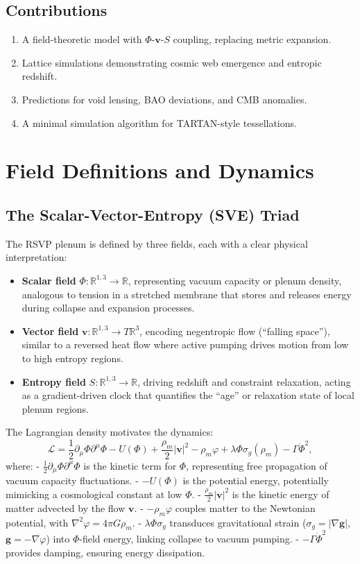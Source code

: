\documentclass[11pt]{article}
\theoremstyle{plain}
\theoremstyle{definition}
\begin{document}
\subsection{Contributions}
\begin{enumerate}
    \item A field-theoretic model with $\Phi$-$\bm{v}$-$S$ coupling, replacing metric expansion.
    \item Lattice simulations demonstrating cosmic web emergence and entropic redshift.
    \item Predictions for void lensing, BAO deviations, and CMB anomalies.
    \item A minimal simulation algorithm for TARTAN-style tessellations.
\end{enumerate}

\section{Field Definitions and Dynamics}
\subsection{The Scalar-Vector-Entropy (SVE) Triad}
The RSVP plenum is defined by three fields, each with a clear physical interpretation:
\begin{itemize}
    \item \textbf{Scalar field} $\Phi: \mathbb{R}^{1,3} \to \mathbb{R}$, representing vacuum capacity or plenum density, analogous to tension in a stretched membrane that stores and releases energy during collapse and expansion processes.
    \item \textbf{Vector field} $\bm{v}: \mathbb{R}^{1,3} \to T\mathbb{R}^3$, encoding negentropic flow (``falling space''), similar to a reversed heat flow where active pumping drives motion from low to high entropy regions.
    \item \textbf{Entropy field} $S: \mathbb{R}^{1,3} \to \mathbb{R}$, driving redshift and constraint relaxation, acting as a gradient-driven clock that quantifies the ``age'' or relaxation state of local plenum regions.
\end{itemize}

The Lagrangian density motivates the dynamics:
\begin{equation}
\mathcal{L} = \frac{1}{2} \partial_\mu \Phi \partial^\mu \Phi - U(\Phi) + \frac{\rho_m}{2} |\bm{v}|^2 - \rho_m \varphi + \lambda \Phi \sigma_g(\rho_m) - \Gamma \dot{\Phi}^2,
\label{eq:L}
\end{equation}
where:
- $\frac{1}{2} \partial_\mu \Phi \partial^\mu \Phi$ is the kinetic term for $\Phi$, representing free propagation of vacuum capacity fluctuations.
- $-U(\Phi)$ is the potential energy, potentially mimicking a cosmological constant at low $\Phi$.
- $\frac{\rho_m}{2} |\bm{v}|^2$ is the kinetic energy of matter advected by the flow $\bm{v}$.
- $-\rho_m \varphi$ couples matter to the Newtonian potential, with $\nabla^2 \varphi = 4\pi G \rho_m$.
- $\lambda \Phi \sigma_g$ transduces gravitational strain ($\sigma_g = |\nabla \bm{g}|$, $\bm{g} = -\nabla \varphi$) into $\Phi$-field energy, linking collapse to vacuum pumping.
- $-\Gamma \dot{\Phi}^2$ provides damping, ensuring energy dissipation.
\end{document}
